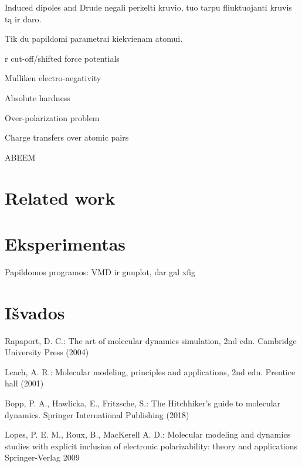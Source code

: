 \documentclass[runningheads]{llncs}
\begin{document}
Induced dipoles and Drude negali perkelti kruvio, tuo tarpu fliuktuojanti kruvis tą ir daro.

Tik du papildomi parametrai kiekvienam atomui.

r cut-off/shifted force potentials

Mulliken electro-negativity

Absolute hardness

Over-polarization problem

Charge transfers over atomic pairs

ABEEM
\section{Related work}
\section{Eksperimentas}
Papildomos programos: VMD ir gnuplot, dar gal xfig
\section{Išvados}

%
%
%
% 
% 
%
\begin{thebibliography}{8}
    Rapaport, D. C.: The art of molecular dynamics simulation, 2nd edn. Cambridge University Press (2004)

    Leach, A. R.: Molecular modeling, principles and applications, 2nd edn. Prentice hall (2001)

    Bopp, P. A., Hawlicka, E., Fritzsche, S.: The Hitchhiker’s guide to molecular dynamics. Springer International Publishing (2018)

    Lopes, P. E. M., Roux, B., MacKerell A. D.:
    Molecular modeling and dynamics studies with explicit inclusion of electronic polarizability: theory and applications Springer-Verlag 2009
\end{thebibliography}
\end{document}
